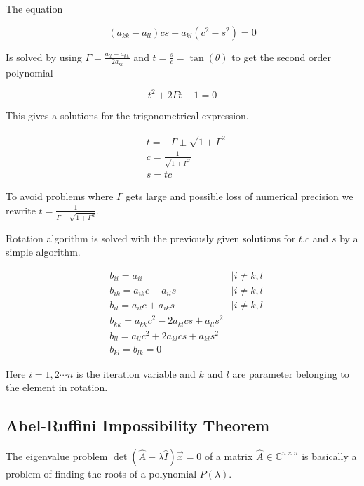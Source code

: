 \documentclass[twoside,twocolumn]{article}
\newcommand{\nl}{
	
	\medskip
	\noindent
}
\begin{document}
	The equation
	
	\begin{equation*}
	(a_{kk}-a_{ll})cs + a_{kl}(c^2-s^2) = 0
	\end{equation*}
	
	
	\noindent
	Is solved by using $\Gamma = \frac{a_{ll} - a_{kk}}{2a_{kl}}$ and $t = \frac{s}{c}= \tan(\theta)$ to get the second order polynomial
	
	\begin{equation*}
		t^2 + 2\Gamma t-1 = 0
	\end{equation*}
	
	This gives a solutions for the trigonometrical expression.
	
	\begin{align*}
	&t = -\Gamma\pm \sqrt{1+\Gamma^2}\\
	&c = \frac{1}{\sqrt{1 + \Gamma^2}}\\
	&s = tc
	\end{align*}
	
	To avoid problems where $\Gamma$ gets large and possible loss of numerical precision we rewrite $t = \frac{1}{\Gamma + \sqrt{1+\Gamma^2}}$.
	\nl
	Rotation algorithm is solved with the previously given solutions for $t$,$c$ and $s$ by a simple algorithm. 
	
	\begin{align*}
	&b_{ii} = a_{ii} &|i\neq k,l\\
	&b_{ik} = a_{ik}c - a_{il}s &|i\neq k,l\\
	&b_{il} = a_{il}c + a_{ik}s &|i\neq k,l\\
	&b_{kk} = a_{kk}c^2 - 2a_{kl}cs + a_{ll}s^2&\\
	&b_{ll} = a_{ll}c^2 + 2a_{kl}cs + a_{kl}s^2&\\
	&b_{kl} = b_{lk} = 0&
	\end{align*}
	
	\noindent
	
	Here $i = 1,2\cdots n$ is the iteration variable and $k$ and $l$ are parameter belonging to the element in rotation.
	
	\subsection{Abel-Ruffini Impossibility Theorem}
	
	The eigenvalue problem $\det(\hat{A}-\lambda \hat{I})\vec{x} = 0$ of a matrix $\hat{A}\in \mathbb{C}^{n\times n}$ is basically a problem of finding the roots of a polynomial $P(\lambda)$. 
	
\end{document}
